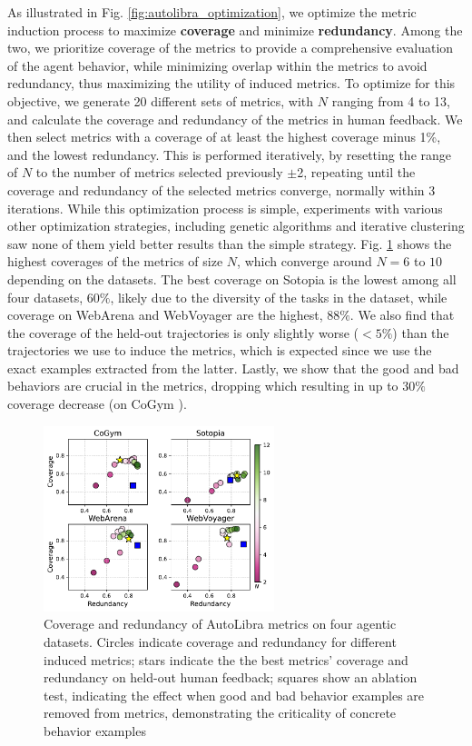 As illustrated in Fig. \ref{fig:autolibra_optimization}, we optimize the metric
induction process to maximize \textbf{coverage} and minimize \textbf{redundancy}.
Among the two, we prioritize coverage of the metrics to provide a comprehensive
evaluation of the agent behavior, while minimizing overlap within the metrics to
avoid redundancy, thus maximizing the utility of induced metrics. To optimize for
this objective, we generate 20 different sets of metrics, with $N$ ranging from 4
to 13, and calculate the coverage and redundancy of the metrics in human
feedback.
We then select metrics with a coverage of at least the highest coverage minus 1\%,
and the lowest redundancy. This is performed iteratively, by resetting the range
of $N$ to the number of metrics selected previously $\pm$2, repeating until the coverage
and redundancy of the selected metrics converge, normally within 3 iterations. While
this optimization process is simple, experiments with various other optimization
strategies, including genetic algorithms and iterative clustering saw none of them
yield better results than the simple strategy. Fig. \ref{fig:coverage-redundancy}
shows the highest coverages of the metrics of size $N$, which converge around
$N=6$ to $10$ depending on the datasets. The best coverage on Sotopia \citep{zhousotopia}
is the lowest among all four datasets, $60\%$, likely due to the diversity of
the tasks in the dataset, while coverage on WebArena \citep{zhouwebarena} and
WebVoyager \citep{he2024webvoyager} are the highest, $88\%$. We also find that the
coverage of the held-out trajectories is only slightly worse ($<5\%$) than the trajectories
we use to induce the metrics, which is expected since we use the exact examples
extracted from the latter. Lastly, we show that the good and bad behaviors are
crucial in the metrics, dropping which resulting in up to $30\%$ coverage decrease
(on CoGym \citep{shao2024collaborative}).
\begin{figure}
	\vspace{-10pt}
	\includegraphics[width=0.6\textwidth]{figs/four_datasets_grid.pdf}
	\vspace{-15pt}
	\caption{Coverage and redundancy of AutoLibra metrics on four agentic datasets.
		Circles indicate coverage and redundancy for different induced metrics; stars
		indicate the the best metrics' coverage and redundancy on held-out human feedback;
		squares show an ablation test, indicating the effect when good and bad behavior
		examples are removed from metrics, demonstrating the criticality of concrete
		behavior examples}
	\label{fig:coverage-redundancy}
\end{figure}
